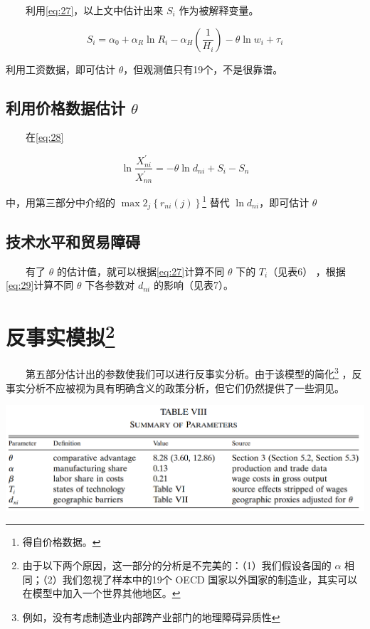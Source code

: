 \documentclass[]{article}
\let\rmarkdownfootnote\footnote%
\def\footnote{\protect\rmarkdownfootnote}
\begin{document}
　　利用\eqref{eq:27}，以上文中估计出来 \(S_i\) 作为被解释变量。

\[
S_{i}=\alpha_{0}+\alpha_{R} \ln R_{i}-\alpha_{H}\left(\frac{1}{H_{i}}\right)-\theta \ln w_{i}+\tau_{i}
\]

利用工资数据，即可估计 \(\theta\)，但观测值只有19个，不是很靠谱。

\hypertarget{theta-2}{%
\subsection{\texorpdfstring{利用价格数据估计 \(\theta\)}{利用价格数据估计 \textbackslash theta}}\label{theta-2}}

　　在\eqref{eq:28}

\[\ln \frac{X_{n i}^{\prime}}{X_{n n}^{\prime}}=-\theta \ln d_{n i}+S_i-S_n\]

中，用第三部分中介绍的 \(\max 2_{j}\left\{r_{n i}(j)\right\}\)\footnote{得自价格数据。} 替代 \(\ln d_{n i}\)，即可估计 \(\theta\)

\hypertarget{section-25}{%
\subsection{技术水平和贸易障碍}\label{section-25}}

　　有了 \(\theta\) 的估计值，就可以根据\eqref{eq:27}计算不同 \(\theta\) 下的 \(T_i\)（见表6） ，根据\eqref{eq:29}计算不同 \(\theta\) 下各参数对 \(d_{ni}\) 的影响（见表7）。

\hypertarget{section-26}{%
\section[反事实模拟]{\texorpdfstring{反事实模拟\footnote{由于以下两个原因，这一部分的分析是不完美的：（1）我们假设各国的 \(\alpha\) 相同；（2）我们忽视了样本中的19个 OECD 国家以外国家的制造业，其实可以在模型中加入一个世界其他地区。}}{反事实模拟}}\label{section-26}}

　　第五部分估计出的参数使我们可以进行反事实分析。由于该模型的简化\footnote{例如，没有考虑制造业内部跨产业部门的地理障碍异质性} ，反事实分析不应被视为具有明确含义的政策分析，但它们仍然提供了一些洞见。

\begin{center}\includegraphics[width=1\linewidth]{Figures/Table8} \end{center}
\end{document}
